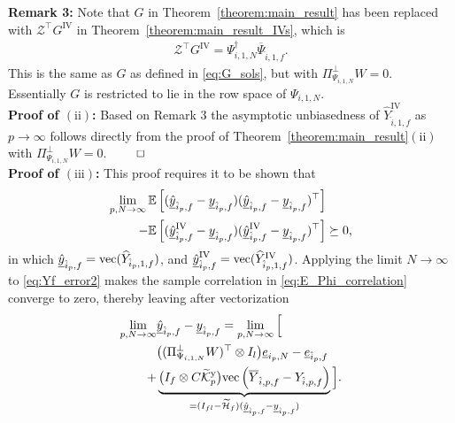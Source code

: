 \textbf{Remark 3:} Note that $G$ in Theorem~\ref{theorem:main_result} has been replaced with $\mathcal{Z}^\top G^\mathrm{IV}$ in Theorem~\ref{theorem:main_result_IVs}, which is
\begin{align*}
    \mathcal{Z}^\top G^\mathrm{IV} = \Psi_{i,1,N}^\dagger \overline{\Psi}_{\hat{i},1,f}.
\end{align*}
This is the same as $G$ as defined in \eqref{eq:G_sols}, but with $\Pi_{\Psi_{i,1,N}}^\bot W=0$. Essentially $G$ is restricted to lie in the row space of $\Psi_{i,1,N}$.\\
\textbf{Proof of $\mathrm{(ii)}$:} Based on Remark 3 the asymptotic unbiasedness of $\widehat{Y}_{\hat{i},1,f}^\mathrm{IV}$ as $p\rightarrow\infty$ follows directly from the proof of Theorem~\ref{theorem:main_result}$\mathrm{(ii)}$ with $\Pi_{\Psi_{i,1,N}}^\bot W=0$. $\hfill \qed$\\
\textbf{Proof of $\mathrm{(iii)}$:} This proof requires it to be shown that
\begin{align}\label{eq:CovarianceDecrease}
\begin{split}
     \lim_{p,N\rightarrow\infty} \mathbb{E}&\left[(\underline{\hat{y}}_{\hat{i}_p,f}-\underline{y}_{\hat{i}_p,f})(\underline{\hat{y}}_{\hat{i}_p,f}-\underline{y}_{\hat{i}_p,f})^\top\right]\\
   -\mathbb{E} &\left[(\underline{\hat{y}}_{\hat{i}_p,f}^\mathrm{IV}-\underline{y}_{\hat{i}_p,f})(\underline{\hat{y}}_{\hat{i}_p,f}^\mathrm{IV}-\underline{y}_{\hat{i}_p,f})^\top\right] \succeq 0,   
\end{split}
\end{align}
in which $\underline{\hat{y}}_{\hat{i}_p,f}=\text{vec}(\widehat{Y}_{\hat{i}_p,1,f})$, and $\underline{\hat{y}}_{\hat{i}_p,f}^\mathrm{IV}=\text{vec}(\widehat{Y}_{\hat{i}_p,1,f}^\mathrm{IV})$. Applying the limit $N\rightarrow\infty$ to \eqref{eq:Yf_error2} makes the sample correlation in \eqref{eq:E_Phi_correlation} converge to zero, thereby leaving after vectorization
\begin{align*}
\begin{split}
    \lim_{p,N\rightarrow\infty} &\datavec{\hat{y}}{\hat{i}_p,f}-\datavec{y}{\hat{i}_p,f}%
     = \lim_{p,N\rightarrow\infty}\Big[\\
     &\big((\Pi_{\Psi_{i,1,N}}^\bot W)^\top \otimes I_l\big)\datavec{e}{i_p,N}-\datavec{e}{\hat{i}_p,f}\\
     +&\underbrace{\big(I_f \otimes C\tKp{y}\big)\text{vec}\left(\overline{Y}_{\hat{i},p,f}-Y_{\hat{i},p,f}\right)}_{=(I_{fl}-\mathcal{\widetilde{H}}_{f})(\datavec{\hat{y}}{\hat{i}_p,f}-\datavec{y}{\hat{i}_p,f})}\Big].
\end{split}
\end{align*}
